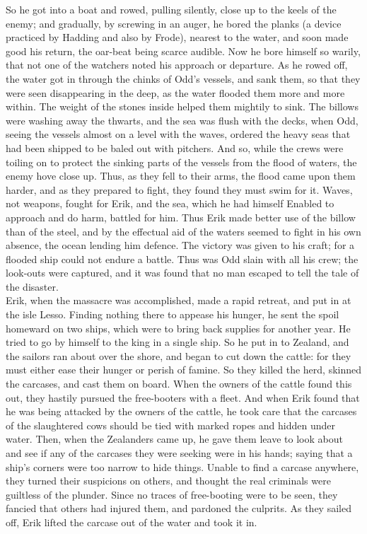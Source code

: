 \documentclass[10pt,a4paper]{report}
\begin{document}
So he got into a boat and rowed, pulling silently, close up to the keels of the enemy; and gradually, by screwing in an auger, he bored the planks (a device practiced by Hadding and also by Frode), nearest to the water, and soon made good his return, the oar-beat being scarce audible. Now he bore himself so warily, that not one of the watchers noted his approach or departure. As he rowed off, the water got in through the chinks of Odd's vessels, and sank them, so that they were seen disappearing in the deep, as the water flooded them more and more within. The weight of the stones inside helped them mightily to sink. The billows were washing away the thwarts, and the sea was flush with the decks, when Odd, seeing the vessels almost on a level with the waves, ordered the heavy seas that had been shipped to be baled out with pitchers. And so, while the crews were toiling on to protect the sinking parts of the vessels from the flood of waters, the enemy hove close up. Thus, as they fell to their arms, the flood came upon them harder, and as they prepared to fight, they found they must swim for it. Waves, not weapons, fought for Erik, and the sea, which he had himself Enabled to approach and do harm, battled for him. Thus Erik made better use of the billow than of the steel, and by the effectual aid of the waters seemed to fight in his own absence, the ocean lending him defence. The victory was given to his craft; for a flooded ship could not endure a battle. Thus was Odd slain with all his crew; the look-outs were captured, and it was found that no man escaped to tell the tale of the disaster.\\

Erik, when the massacre was accomplished, made a rapid retreat, and put in at the isle Lesso. Finding nothing there to appease his hunger, he sent the spoil homeward on two ships, which were to bring back supplies for another year. He tried to go by himself to the king in a single ship. So he put in to Zealand, and the sailors ran about over the shore, and began to cut down the cattle: for they must either ease their hunger or perish of famine. So they killed the herd, skinned the carcases, and cast them on board. When the owners of the cattle found this out, they hastily pursued the free-booters with a fleet. And when Erik found that he was being attacked by the owners of the cattle, he took care that the carcases of the slaughtered cows should be tied with marked ropes and hidden under water. Then, when the Zealanders came up, he gave them leave to look about and see if any of the carcases they were seeking were in his hands; saying that a ship's corners were too narrow to hide things. Unable to find a carcase anywhere, they turned their suspicions on others, and thought the real criminals were guiltless of the plunder. Since no traces of free-booting were to be seen, they fancied that others had injured them, and pardoned the culprits. As they sailed off, Erik lifted the carcase out of the water and took it in.\\
\end{document}
